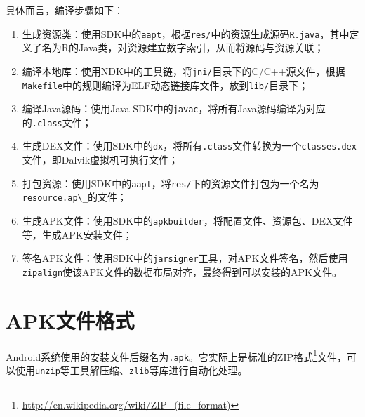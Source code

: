 具体而言，编译步骤如下：
\begin{enumerate}
  \item 生成资源类：使用SDK中的\lstinline!aapt!，根据\lstinline!res/!中的资源生成源码\lstinline!R.java!，其中定义了名为R的Java类，对资源建立数字索引，从而将源码与资源关联；
  \item 编译本地库：使用NDK中的工具链，将\lstinline!jni/!目录下的C/C++源文件，根据\lstinline!Makefile!中的规则编译为ELF动态链接库文件，放到\lstinline!lib/!目录下；
  \item 编译Java源码：使用Java SDK中的\lstinline!javac!，将所有Java源码编译为对应的\lstinline!.class!文件；
  \item 生成DEX文件：使用SDK中的\lstinline!dx!，将所有\lstinline!.class!文件转换为一个\lstinline!classes.dex!文件，即Dalvik虚拟机可执行文件；
  \item 打包资源：使用SDK中的\lstinline!aapt!，将\lstinline!res/!下的资源文件打包为一个名为\lstinline!resource.ap\_!的文件；
  \item 生成APK文件：使用SDK中的\lstinline!apkbuilder!，将配置文件、资源包、DEX文件等，生成APK安装文件；
  \item 签名APK文件：使用SDK中的\lstinline!jarsigner!工具，对APK文件签名，然后使用\lstinline!zipalign!使该APK文件的数据布局对齐，最终得到可以安装的APK文件。
\end{enumerate}

\section{APK文件格式}
Android系统使用的安装文件后缀名为\lstinline!.apk!。它实际上是标准的ZIP格式\footnote{\url{http://en.wikipedia.org/wiki/ZIP\_(file\_format)}}文件，可以使用\lstinline!unzip!等工具解压缩、\lstinline!zlib!等库进行自动化处理。

